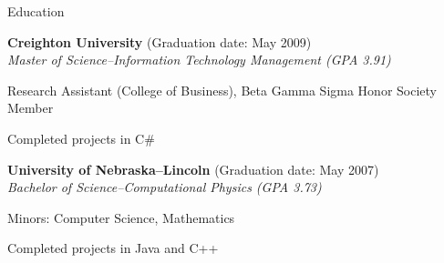 \begin{itemize1}
		
\end{itemize1}

\begin{Large}\textsf{Education}\end{Large} \vspace{-2mm}

\begin{itemize1}
	\item \textbf{Creighton University} (Graduation date: May 2009) \\
		\textit{Master of Science--Information Technology Management (GPA 3.91)} \vspace{-1.5mm}
		\begin{itemize1}			
			\item Research Assistant (College of Business), Beta Gamma Sigma Honor Society Member
			\item Completed projects in C\#
		\end{itemize1}
	\item \textbf{University of Nebraska--Lincoln} (Graduation date: May 2007) \\
		\textit{Bachelor of Science--Computational Physics (GPA 3.73)} \vspace{-1.5mm}
		\begin{itemize1}			
			\item Minors: Computer Science, Mathematics
			\item Completed projects in Java and C++
		\end{itemize1}
\end{itemize1}
